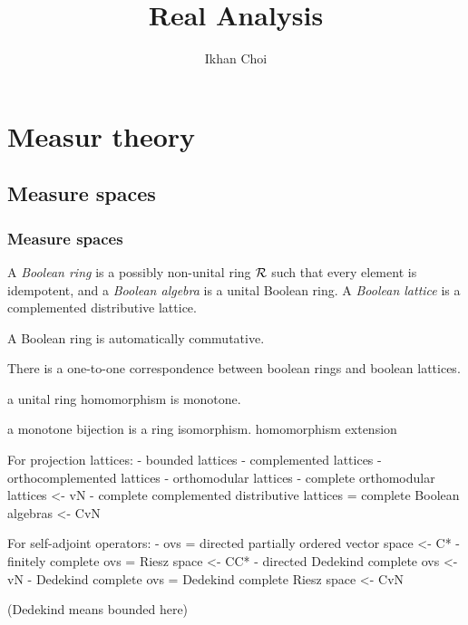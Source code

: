 \documentclass{../../large}
\begin{document}
\title{Real Analysis}
\author{Ikhan Choi}
\maketitle
\tableofcontents

\part{Measur theory}


\chapter{Measure spaces}


\section{Measure spaces}



\begin{prb}
A \emph{Boolean ring} is a possibly non-unital ring $\mathcal{R}$ such that every element is idempotent, and a \emph{Boolean algebra} is a unital Boolean ring.
A \emph{Boolean lattice} is a complemented distributive lattice.
\begin{parts}
\item A Boolean ring is automatically commutative.
\item There is a one-to-one correspondence between boolean rings and boolean lattices.
\item a unital ring homomorphism is monotone.
\item a monotone bijection is a ring isomorphism.
homomorphism extension
\end{parts}
\end{prb}


For projection lattices:
- bounded lattices
- complemented lattices
- orthocomplemented lattices
- orthomodular lattices
- complete orthomodular lattices <- vN
- complete complemented distributive lattices
	= complete Boolean algebras <- CvN

For self-adjoint operators:
- ovs = directed partially ordered vector space <- C*
- finitely complete ovs
	= Riesz space <- CC*
- directed Dedekind complete ovs <- vN
- Dedekind complete ovs
	= Dedekind complete Riesz space <- CvN



(Dedekind means bounded here)
\end{document}
